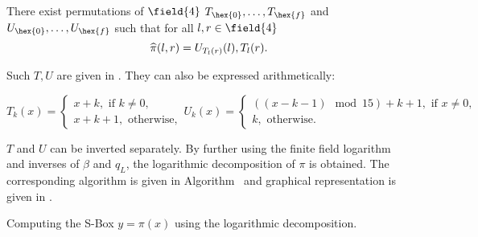 \begin{observation}
There exist permutations of $\field{4}$ $T_{\hex{0}},\ldots,T_{\hex{f}}$ and $U_{\hex{0}}, \ldots, U_{\hex{f}}$ such that for all $l,r \in \field{4}$
$$
\widehat{\pi}(l,r) = U_{T_l(r)}(l), T_l(r).
$$


Such $T,U$ are given in . They can also be expressed arithmetically:

\begin{equation*}
    T_k(x) = \begin{cases}
    x + k, \mbox{ if } k \ne 0, \\
    x + k + 1, \mbox{ otherwise},
    \end{cases}
    U_k(x) = \begin{cases}
    ((x - k - 1) \mod{15}) + k + 1, \mbox{ if } x \ne 0, \\
    k, \mbox{ otherwise}.
    \end{cases}
\end{equation*}
\end{observation}

$T$ and $U$ can be inverted separately. By further using the finite field logarithm and inverses of $\beta$ and $q_L$, the logarithmic decomposition of $\pi$ is obtained. The corresponding algorithm is given in Algorithm~ and graphical representation is given in .

\begin{algorithm}
    \caption{Computing the S-Box $y = \pi(x)$ using the logarithmic decomposition.}
    \begin{algorithmic}
        \Else
        \EndIf
    \end{algorithmic}
\end{algorithm}

